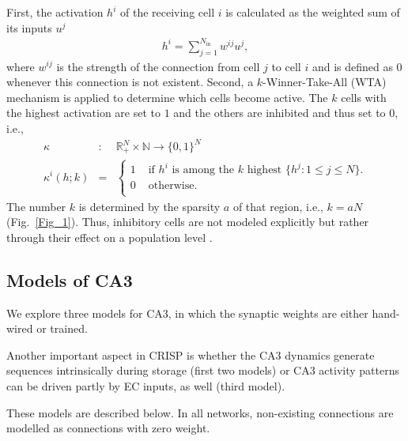 \documentclass[utf8]{frontiersSCNS} %
\begin{document}
First, the activation $h^i$ of the receiving cell $i$ is calculated as the weighted sum of its inputs $u^j$
\begin{align}
	\label{activation}
	h^i = \sum_{j=1}^{N_\mathrm{in}} w^{ij}u^j,
\end{align}  
where $w^{ij}$ is the strength of the connection from cell $j$ to cell $i$ and is defined as $0$ whenever this connection is not existent. Second, a $k$-Winner-Take-All (WTA) mechanism is applied to determine which cells become active. The $k$ cells with the highest activation are set to $1$ and the others are inhibited and thus set to $0$, i.e.,
\begin{eqnarray}
\label{eq:kWTA}
	\kappa &:& \mathbb{R}_+^N \times \mathbb{N} \to \{0,1\}^N \\
	\kappa^i (h;k) &=& \left \{ \begin{array}{ll}
			1 &\text{ if $h^i$ is among the $k$ highest } \{ h^j:1\le j\le N \}. \\
			0 &\text{ otherwise}.\\
	\end{array} \right.
	\label{eq:binary}
\end{eqnarray}
The number $k$ is determined by the sparsity $a$ of that region, i.e., $k = aN$ (Fig.~\ref{Fig_1}). 
Thus, inhibitory cells are not modeled explicitly but rather through their effect on a population level \cite{renno2010mechanism, roudi2008representing, moustafa2009neurocomputational, appleby2011role, monaco2011modular}.


\subsection{Models of CA3}
\label{ca3:models}


We explore three models for CA3, in which the synaptic weights are either hand-wired or trained. 

Another important aspect in CRISP is whether the CA3 dynamics generate sequences intrinsically during storage (first two models) or CA3 activity patterns can be driven partly by EC inputs, as well (third model). 

These models are described below.
In all networks, non-existing connections are modelled as connections with zero weight.
\end{document}
